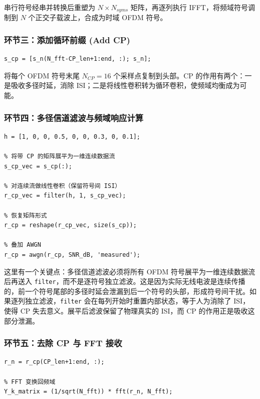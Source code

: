 \documentclass[a4paper, 11pt]{ctexart}
\begin{document}
串行符号经串并转换后重塑为 $N \times N_{syms}$ 矩阵，再逐列执行 IFFT，将频域符号调制到 $N$ 个正交子载波上，合成为时域 OFDM 符号。

\subsubsection{环节三：添加循环前缀 (Add CP)}

\begin{lstlisting}[caption={循环前缀添加代码}]
% 复制每个 OFDM 符号末尾 CP_len 个采样点至头部
s_cp = [s_n(N_fft-CP_len+1:end, :); s_n];
\end{lstlisting}

将每个 OFDM 符号末尾 $N_{CP} = 16$ 个采样点复制到头部。CP 的作用有两个：一是吸收多径时延，消除 ISI；二是将线性卷积转为循环卷积，使频域均衡成为可能。

\subsubsection{环节四：多径信道滤波与频域响应计算}

\begin{lstlisting}[caption={多径信道滤波代码（连续数据流）}]
% 多径信道冲激响应
h = [1, 0, 0, 0.5, 0, 0, 0.3, 0, 0.1];

% 将带 CP 的矩阵展平为一维连续数据流
s_cp_vec = s_cp(:);

% 对连续流做线性卷积（保留符号间 ISI）
r_cp_vec = filter(h, 1, s_cp_vec);

% 恢复矩阵形式
r_cp = reshape(r_cp_vec, size(s_cp));

% 叠加 AWGN
r_cp = awgn(r_cp, SNR_dB, 'measured');
\end{lstlisting}

这里有一个关键点：多径信道滤波必须将所有 OFDM 符号展平为一维连续数据流后再送入 \texttt{filter}，而不是逐符号独立滤波。这是因为实际无线电波是连续传播的，前一个符号尾部的多径时延会泄漏到后一个符号的头部，形成符号间干扰。如果逐列独立滤波，\texttt{filter} 会在每列开始时重置内部状态，等于人为消除了 ISI，使得 CP 失去意义。展平后滤波保留了物理真实的 ISI，而 CP 的作用正是吸收这部分泄漏。

\subsubsection{环节五：去除 CP 与 FFT 接收}

\begin{lstlisting}[caption={去除 CP 与 FFT 代码}]
% 去除循环前缀
r_n = r_cp(CP_len+1:end, :);

% FFT 变换回频域
Y_k_matrix = (1/sqrt(N_fft)) * fft(r_n, N_fft);
\end{lstlisting}
\end{document}
